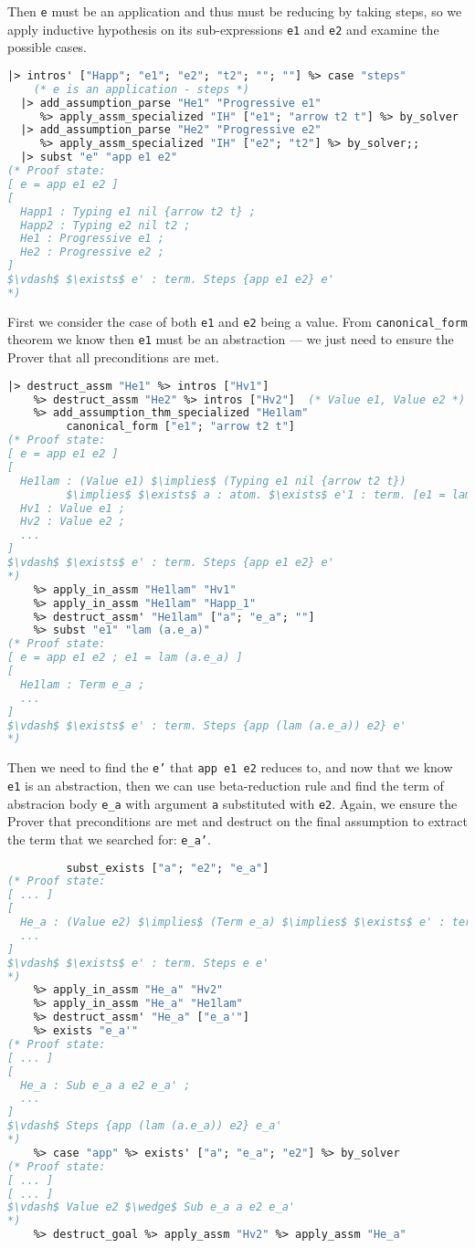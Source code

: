 \documentclass[english, mgr]{iithesis}
\renewcommand{\tt}[1]{\texttt{\small{#1}}}
\begin{document}
Then \tt{e} must be an application and thus must be reducing by taking steps,
so we apply inductive hypothesis on its sub-expressions \tt{e1} and \tt{e2}
and examine the possible cases.
\begin{lstlisting}[mathescape,language=OCaml]
  |> intros' ["Happ"; "e1"; "e2"; "t2"; ""; ""] %> case "steps"
    (* e is an application - steps *)
  |> add_assumption_parse "He1" "Progressive e1"
     %> apply_assm_specialized "IH" ["e1"; "arrow t2 t"] %> by_solver
  |> add_assumption_parse "He2" "Progressive e2"
     %> apply_assm_specialized "IH" ["e2"; "t2"] %> by_solver;;
  |> subst "e" "app e1 e2"
(* Proof state:
[ e = app e1 e2 ]
[
  Happ1 : Typing e1 nil {arrow t2 t} ;
  Happ2 : Typing e2 nil t2 ;
  He1 : Progressive e1 ;
  He2 : Progressive e2 ;
]
$\vdash$ $\exists$ e' : term. Steps {app e1 e2} e'
*)
\end{lstlisting}
First we consider the case of both \tt{e1} and \tt{e2} being a value.
From \tt{canonical\_form} theorem we know then \tt{e1} must be an abstraction
--- we just need to ensure the Prover that all preconditions are met.
\begin{lstlisting}[mathescape, language=OCaml]
  |> destruct_assm "He1" %> intros ["Hv1"]
    %> destruct_assm "He2" %> intros ["Hv2"]  (* Value e1, Value e2 *)
    %> add_assumption_thm_specialized "He1lam"
         canonical_form ["e1"; "arrow t2 t"]
(* Proof state:
[ e = app e1 e2 ]
[
  He1lam : (Value e1) $\implies$ (Typing e1 nil {arrow t2 t})
         $\implies$ $\exists$ a : atom. $\exists$ e'1 : term. [e1 = lam (a.e'1)] $\wedge$ Term e'1 ;
  Hv1 : Value e1 ;
  Hv2 : Value e2 ;
  ...
]
$\vdash$ $\exists$ e' : term. Steps {app e1 e2} e'
*)
    %> apply_in_assm "He1lam" "Hv1"
    %> apply_in_assm "He1lam" "Happ_1"
    %> destruct_assm' "He1lam" ["a"; "e_a"; ""]
    %> subst "e1" "lam (a.e_a)"
(* Proof state:
[ e = app e1 e2 ; e1 = lam (a.e_a) ]
[
  He1lam : Term e_a ;
  ...
]
$\vdash$ $\exists$ e' : term. Steps {app (lam (a.e_a)) e2} e'
*)
\end{lstlisting}
Then we need to find the \tt{e'} that \tt{app e1 e2} reduces to, and now
that we know \tt{e1} is an abstraction, then we can use beta-reduction rule
and find the term of abstracion body \tt{e\_a} with argument \tt{a}
substituted with \tt{e2}. Again, we ensure the Prover that preconditions are met
and destruct on the final assumption to extract the term that we searched for: \tt{e\_a'}.
\begin{lstlisting}[mathescape, language=OCaml]
    %> add_assumption_thm_specialized "He_a"
         subst_exists ["a"; "e2"; "e_a"]
(* Proof state:
[ ... ]
[
  He_a : (Value e2) $\implies$ (Term e_a) $\implies$ $\exists$ e' : term. Sub e_a a e2 e' ;
  ...
]
$\vdash$ $\exists$ e' : term. Steps e e'
*)
    %> apply_in_assm "He_a" "Hv2"
    %> apply_in_assm "He_a" "He1lam"
    %> destruct_assm' "He_a" ["e_a'"]
    %> exists "e_a'"
(* Proof state:
[ ... ]
[
  He_a : Sub e_a a e2 e_a' ;
  ...
]
$\vdash$ Steps {app (lam (a.e_a)) e2} e_a'
*)
    %> case "app" %> exists' ["a"; "e_a"; "e2"] %> by_solver
(* Proof state:
[ ... ]
[ ... ]
$\vdash$ Value e2 $\wedge$ Sub e_a a e2 e_a'
*)
    %> destruct_goal %> apply_assm "Hv2" %> apply_assm "He_a"
\end{lstlisting}
\end{document}
